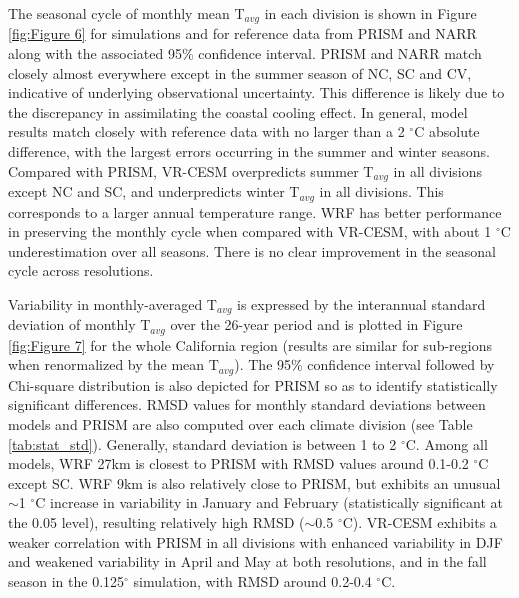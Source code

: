 \documentclass[ms]{agutex}   %
\begin{document}
\begin{article}
The seasonal cycle of monthly mean T$_{avg}$ in each division is shown in Figure \ref{fig:Figure 6} for simulations and for reference data from PRISM and NARR along with the associated 95\% confidence interval. PRISM and NARR match closely almost everywhere except in the summer season of NC, SC and CV, indicative of underlying observational uncertainty. This difference is likely due to the discrepancy in assimilating the coastal cooling effect.  In general, model results match closely with reference data with no larger than a 2 $^\circ$C absolute difference, with the largest errors occurring in the summer and winter seasons.  Compared with PRISM, VR-CESM overpredicts summer T$_{avg}$ in all divisions except NC and SC, and underpredicts winter T$_{avg}$ in all divisions.  This corresponds to a larger annual temperature range. WRF has better performance in preserving the monthly cycle when compared with VR-CESM, with about 1 $^\circ$C underestimation over all seasons. There is no clear improvement in the seasonal cycle across resolutions.

Variability in monthly-averaged T$_{avg}$ is expressed by the interannual standard deviation of monthly T$_{avg}$ over the 26-year period and is plotted in Figure \ref{fig:Figure 7} for the whole California region (results are similar for sub-regions when renormalized by the mean T$_{avg}$). The 95\% confidence interval followed by Chi-square distribution is also depicted for PRISM so as to identify statistically significant differences.  RMSD values for monthly standard deviations between models and PRISM are also computed over each climate division (see Table \ref{tab:stat_std}). Generally, standard deviation is between 1 to 2 $^\circ$C. Among all models, WRF 27km is closest to PRISM with RMSD values around 0.1-0.2 $^\circ$C except SC. WRF 9km is also relatively close to PRISM, but exhibits an unusual $\sim$1 $^\circ$C increase in variability in January and February (statistically significant at the 0.05 level), resulting relatively high RMSD ($\sim$0.5 $^\circ$C). VR-CESM exhibits a weaker correlation with PRISM in all divisions with enhanced variability in DJF and weakened variability in April and May at both resolutions, and in the fall season in the 0.125$^\circ$ simulation, with RMSD around 0.2-0.4 $^\circ$C.


\end{article}
\end{document}

